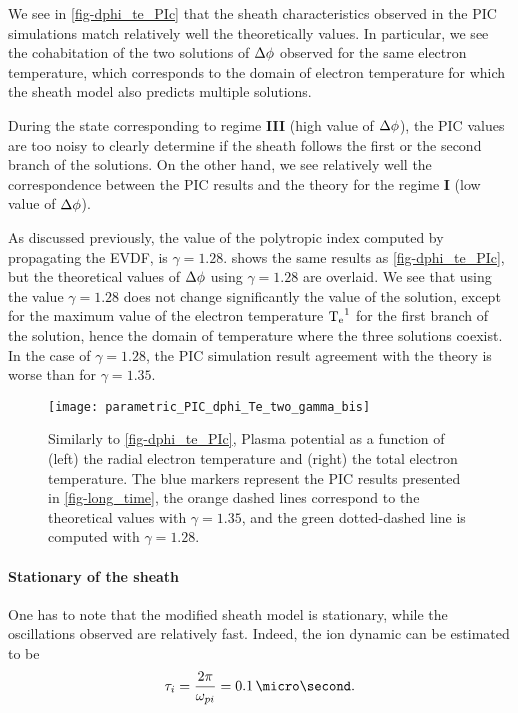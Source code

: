    We see in \cref{fig-dphi_te_PIc} that the sheath characteristics observed in the \ac{PIC}  simulations match relatively well the theoretically values.
    In particular, we see the cohabitation of the two solutions of $\Delta \phi$ observed for the same electron temperature, which corresponds to the domain of electron temperature for which the sheath model also predicts multiple solutions.
    
    During the state corresponding to regime {\bf III} (high value of  $\Delta \phi$), the \ac{PIC} values are too noisy to clearly determine if the sheath follows the first or the second branch of the solutions.
    On the other hand, we see relatively well the correspondence between the \ac{PIC} results and the theory for the regime {\bf I} (low value of $\Delta \phi$).
    
    As discussed previously, the value of the polytropic index computed by propagating the \ac{EVDF}, is $\gamma=1.28$.
     shows the same results as \cref{fig-dphi_te_PIc}, but  the theoretical values of $\Delta \phi$ using $\gamma=1.28$ are overlaid.
    We see that using the value $\gamma=1.28$ does not change significantly the value of the solution, except for the maximum value of the electron temperature $\mathrm{T_e}^1$ for the first branch of the solution, hence the domain of temperature where the three solutions coexist.
    In the case of $\gamma=1.28$, the \ac{PIC} simulation result agreement with the theory is worse than for $\gamma=1.35$.
    
    \begin{figure}[hbt]
      \centering
      \texttt{[image: parametric\_PIC\_dphi\_Te\_two\_gamma\_bis]}
      \caption{Similarly to \cref{fig-dphi_te_PIc}, Plasma potential as a function of (left) the radial electron temperature and (right) the total electron temperature. The blue markers represent the \ac{PIC} results presented in \cref{fig-long_time}, the orange dashed lines correspond to the theoretical values with $\gamma=1.35$, and the green dotted-dashed line is computed with $\gamma=1.28$.}
      \label{fig-dphi_te_PIc2}
    \end{figure}
    
    \paragraph{Stationary of the sheath \\}

    One has to note that the modified sheath model is stationary, while the oscillations observed are relatively fast.
    Indeed, the ion dynamic can be estimated to be
    \begin{equation} \label{eq-ti}
      \tau_i = \frac{2 \pi}{\opi} = 0.1 \,\micro\second.
    \end{equation}
    
